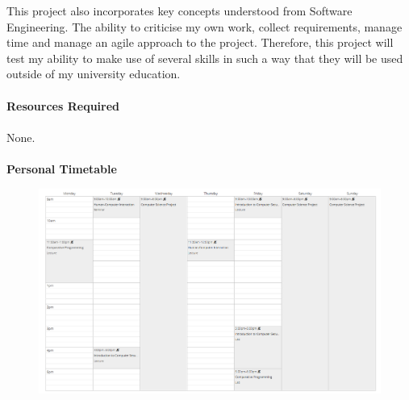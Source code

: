 \documentclass[a4paper, 12pt]{article}
\begin{document}
            This project also incorporates key concepts understood from Software Engineering.
            The ability to criticise my own work, collect requirements, manage time and manage an
            agile approach to the project. Therefore, this project will test my ability to make use
            of several skills in such a way that they will be used outside of my university education. \\\\
            \textbf{Resources Required} \\\\
            None. \\\\
            \clearpage
            \textbf{Personal Timetable}
                \begin{figure}[h]
                    \centering
                    \includegraphics[width=175mm]{timetable.png}
                \end{figure}    

    \clearpage
    \printbibliography
\end{document}
